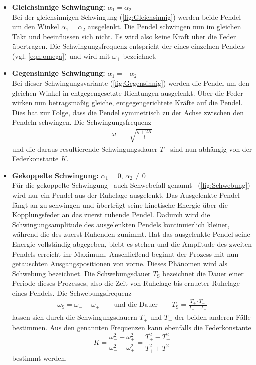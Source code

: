 \begin{itemize}
    \item \textbf{Gleichsinnige Schwingung:} $\alpha_1 = \alpha_2$ \\
    Bei der gleichsinnigen Schwingung (\autoref{fig:Gleichsinnig}) werden beide Pendel um den Winkel $\alpha_1 = \alpha_2$ ausgelenkt. Die Pendel schwingen nun im gleichen Takt und beeinflussen sich nicht.
    Es wird also keine Kraft über die Feder übertragen. Die Schwingungsfrequenz entspricht der eines einzelnen Pendels (vgl. \autoref{eqn:omega}) und wird mit $\omega_+$ bezeichnet.

    \item \textbf{Gegensinnige Schwingung:} $\alpha_1 = -\alpha_2$ \\
    Bei dieser Schwingungsvariante (\autoref{fig:Gegensinnig}) werden die Pendel um den gleichen Winkel in entgegengesetzte Richtungen ausgelenkt. Über die Feder wirken nun betragsmäßig gleiche,
    entgegengerichtete Kräfte auf die Pendel. Dies hat zur Folge, dass die Pendel symmetrisch zu der Achse zwischen den Pendeln schwingen. Die Schwingungsfrequenz 
    \begin{gather}
        \label{eqn:omega_Gegensinnig}
        \omega_- = \sqrt{\frac{g + 2K}{l}}
    \end{gather}
    und die daraus resultierende Schwingungsdauer $T_-$ sind nun abhängig von der Federkonstante $K$. 
    
    \item \textbf{Gekoppelte Schwingung:} $\alpha_1 = 0, \, \alpha_2 \neq 0$ \\
    Für die gekoppelte Schwingung --auch Schwebefall genannt-- (\autoref{fig:Schwebung}) wird nur ein Pendel aus der Ruhelage ausgelenkt. Das Ausgelenkte Pendel fängt an zu schwingen und überträgt seine 
    kinetische Energie über die Kopplungsfeder an das zuerst ruhende Pendel. Dadurch wird die Schwingungsamplitude des ausgelenkten Pendels kontinuierlich kleiner, während
    die des zuerst Ruhenden zunimmt. Hat das ausgelenkte Pendel seine Energie vollständig abgegeben, blebt es stehen und die Amplitude des zweiten Pendels erreicht ihr Maximum.
    Anschließend beginnt der Prozess mit nun getauschten Ausgangspositionen von vorne. Dieses Phänomen wird als Schwebung bezeichnet. Die Schwebungsdauer $T_{\text{S}}$ bezeichnet 
    die Dauer einer Periode dieses Prozesses, also die Zeit von Ruhelage bis ernueter Ruhelage eines Pendels. Die Schwebungsfrequenz
    \begin{gather}
        \label{eqn:Schwebung}
        \omega_{\text{S}} = \omega_- - \omega_+ \qquad \text{und die Dauer} \qquad T_{\text{S}}  = \frac{T_+ \cdot T_-}{T_+ - T_-}
    \end{gather}
    lassen sich durch die Schwingungsdauern $T_+$ und $T_-$ der beiden anderen Fälle bestimmen.
    Aus den genannten Frequenzen kann ebenfalls die Federkonstante
    \begin{equation}
        \label{eqn:Federkonstante}
        K = \frac{\omega_-^2 - \omega_+^2}{\omega_-^2 + \omega_+^2} = \frac{T_+^2 - T_-^2}{T_+^2 + T_-^2}
    \end{equation}
    bestimmt werden.
\end{itemize}

